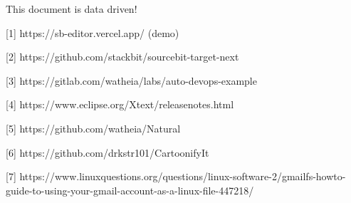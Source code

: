 
This document is data driven!


[1] https://sb-editor.vercel.app/ (demo)

[2] https://github.com/stackbit/sourcebit-target-next

[3] https://gitlab.com/watheia/labs/auto-devops-example

[4] https://www.eclipse.org/Xtext/releasenotes.html

[5] https://github.com/watheia/Natural

[6] https://github.com/drkstr101/CartoonifyIt

[7] https://www.linuxquestions.org/questions/linux-software-2/gmailfs-howto-guide-to-using-your-gmail-account-as-a-linux-file-447218/
